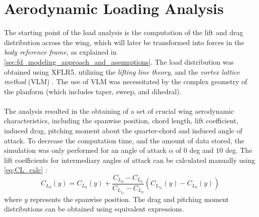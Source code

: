 \section{Aerodynamic Loading Analysis}  \label{sec:fd_aerodynamic_loading_analysis}
The starting point of the load analysis is the computation of the lift and drag distribution across the wing, which will later be transformed into forces in the \textit{body reference frame}, as explained in \autoref{sec:fd_modeling_approach_and_assumptions}. The load distribution was obtained using XFLR5, utilizing the \textit{lifting line theory}, and the \textit{vortex lattice method} (VLM) \cite{} . The use of VLM was necessitated by the complex geometry of the planform (which includes taper, sweep, and dihedral). 
\\
\\
The analysis resulted in the obtaining of a set of crucial wing aerodynamic characteristics, including the spanwise position, chord length, lift coefficient, induced drag, pitching moment about the quarter-chord and induced angle of attack. To decrease the computation time, and the amount of data stored, the simulation was only performed for an angle of attack $\alpha$ of $0$ deg and $10$ deg. The lift coefficients for intermediary angles of attack can be calculated manually using \autoref{eq:CL_calc} \cite[p.24]{Timmer2024AE2111-IReader}:
\begin{equation}
    C_{L_d}(y) = C_{L_0}(y) + \frac{C_{L_d} - C_{L_0}}{C_{L_{1_0}} - C_{L_0}} \left(C_{L_{1_0}}(y) - C_{L_0}(y)\right)
    \label{eq:CL_calc}
\end{equation}
 \noindent where $y$ represents the spanwise position. The drag and pitching moment distributions can be obtained using equivalent expressions.\\
 
